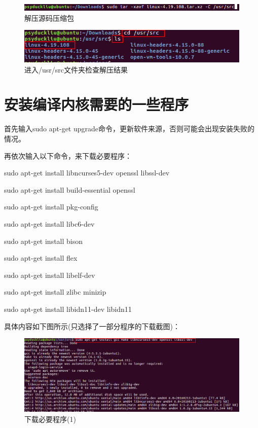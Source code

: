 \documentclass[11pt,a4paper]{article}
\begin{document}
	\begin{figure}[h]
		\centering
		\includegraphics[width=0.7\linewidth]{Pictures/4}
		\caption{解压源码压缩包}
		\label{fig:4}
	\end{figure}
	\begin{figure}[h]
		\centering
		\includegraphics[width=0.7\linewidth]{Pictures/5_WPS}
		\caption{进入/usr/src文件夹检查解压结果}
		\label{fig:5wps}
	\end{figure}

	\section{安装编译内核需要的一些程序}
	首先输入sudo apt-get upgrade命令，更新软件来源，否则可能会出现安装失败的情况。\par
	再依次输入以下命令，来下载必要程序：\par
	sudo apt-get install libncurses5-dev openssl libssl-dev\par 
	sudo apt-get install build-essential openssl\par 
	sudo apt-get install pkg-config\par 
	sudo apt-get install libc6-dev\par 
	sudo apt-get install bison\par 
	sudo apt-get install flex\par 
	sudo apt-get install libelf-dev\par 
	sudo apt-get install zlibc minizip\par 
	sudo apt-get install libidn11-dev libidn11\par 
	具体内容如下图所示(只选择了一部分程序的下载截图)：
	\newpage
	\begin{figure}[h]
		\centering
		\includegraphics[width=0.7\linewidth]{Pictures/6_WPS}
		\caption{下载必要程序(1)}
		\label{fig:6wps}
	\end{figure}
\end{document}
